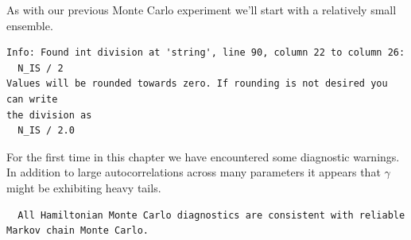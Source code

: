 \documentclass[
  letterpaper,
  DIV=11,
  numbers=noendperiod]{scrartcl}
\newenvironment{Shaded}{\begin{snugshade}}{\end{snugshade}}
\newcommand{\AttributeTok}[1]{\textcolor[rgb]{0.40,0.45,0.13}{#1}}
\newcommand{\DecValTok}[1]{\textcolor[rgb]{0.68,0.00,0.00}{#1}}
\newcommand{\FunctionTok}[1]{\textcolor[rgb]{0.28,0.35,0.67}{#1}}
\newcommand{\NormalTok}[1]{\textcolor[rgb]{0.00,0.23,0.31}{#1}}
\newcommand{\OtherTok}[1]{\textcolor[rgb]{0.00,0.23,0.31}{#1}}
\newcommand{\SpecialCharTok}[1]{\textcolor[rgb]{0.37,0.37,0.37}{#1}}
\newcommand{\StringTok}[1]{\textcolor[rgb]{0.13,0.47,0.30}{#1}}
\begin{document}
As with our previous Monte Carlo experiment we'll start with a
relatively small ensemble.

\begin{Shaded}
\end{Shaded}

\begin{verbatim}
Info: Found int division at 'string', line 90, column 22 to column 26:
  N_IS / 2
Values will be rounded towards zero. If rounding is not desired you can write
the division as
  N_IS / 2.0
\end{verbatim}

For the first time in this chapter we have encountered some diagnostic
warnings. In addition to large autocorrelations across many parameters
it appears that \(\gamma\) might be exhibiting heavy tails.

\begin{Shaded}
\end{Shaded}

\begin{verbatim}
  All Hamiltonian Monte Carlo diagnostics are consistent with reliable
Markov chain Monte Carlo.
\end{verbatim}

\begin{Shaded}
\end{Shaded}
\end{document}
